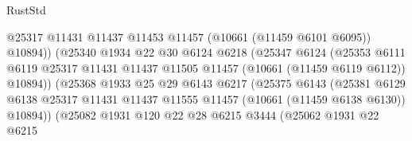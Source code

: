 \begin{lexlean}{RustStd}
\begin{coremodule}
                                        @25317
                                        @11431
                                        @11437
                                        @11453
                                        @11457
                                        (@10661 (@11459 @6101 @6095))
                                        @10894))
                                    (@25340
                                      @1934
                                      @22
                                      @30
                                      @6124
                                      @6218
                                      (@25347
                                        @6124
                                        (@25353
                                          @6111
                                          @6119
                                          @25317
                                          @11431
                                          @11437
                                          @11505
                                          @11457
                                          (@10661 (@11459 @6119 @6112))
                                          @10894))
                                      (@25368
                                        @1933
                                        @25
                                        @29
                                        @6143
                                        @6217
                                        (@25375
                                          @6143
                                          (@25381
                                            @6129
                                            @6138
                                            @25317
                                            @11431
                                            @11437
                                            @11555
                                            @11457
                                            (@10661 (@11459 @6138 @6130))
                                            @10894))
                                        (@25082
                                          @1931
                                          @120
                                          @22
                                          @28
                                          @6215
                                          @3444
                                          (@25062
                                            @1931
                                            @22
                                            @6215

\end{coremodule}
\end{lexlean}
